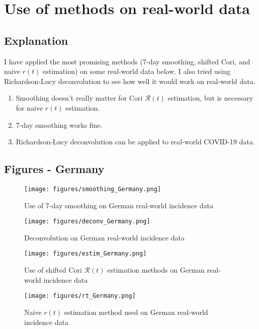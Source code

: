 \documentclass{article}
\newcommand{\nR}{\mathscr{R}}
\newcommand{\nr}{r}
\begin{document}
\section{Use of methods on real-world data}
\subsection{Explanation}
I have applied the most promising methods (7-day smoothing, shifted Cori, and naive $\nr(t)$ estimation) on some real-world data below. I also tried using Richardson-Lucy deconvolution to see how well it would work on real-world data. 

\begin{enumerate}
    \item Smoothing doesn't really matter for Cori $\nR(t)$ estimation, but is necessary for naive $\nr(t)$ estimation.
    \item 7-day smoothing works fine. 
    \item Richardson-Lucy deconvolution can be applied to real-world COVID-19 data.
\end{enumerate}


\subsection{Figures - Germany}
\begin{figure}[h!]
    \centering
    \texttt{[image: figures/smoothing\_Germany.png]}
    \caption{Use of 7-day smoothing on German real-world incidence data}
    \label{fig:my_label}
\end{figure}

\begin{figure}
    \centering
    \texttt{[image: figures/deconv\_Germany.png]}
    \caption{Deconvolution on German real-world incidence data}
    \label{fig:my_label}
\end{figure}

\begin{figure}[h!]
    \centering
    \texttt{[image: figures/estim\_Germany.png]}
    \caption{Use of shifted Cori $\nR(t)$ estimation methods on German real-world incidence data}
    \label{fig:my_label}
\end{figure}

\clearpage
\begin{figure}[h!]
    \centering
    \texttt{[image: figures/rt\_Germany.png]}
    \caption{Naive $\nr(t)$ estimation method used on German real-world incidence data}
    \label{fig:my_label}
\end{figure}
\end{document}
